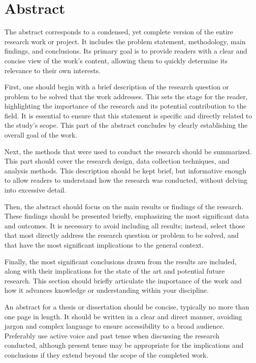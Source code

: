 \section*{Abstract}

The abstract corresponds to a condensed, yet complete version of the entire research work or project. It includes the problem statement, methodology, main findings, and conclusions. Its primary goal is to provide readers with a clear and concise view of the work's content, allowing them to quickly determine its relevance to their own interests.

First, one should begin with a brief description of the research question or problem to be solved that the work addresses. This sets the stage for the reader, highlighting the importance of the research and its potential contribution to the field. It is essential to ensure that this statement is specific and directly related to the study's scope. This part of the abstract concludes by clearly establishing the overall goal of the work.

Next, the methods that were used to conduct the research should be summarized. This part should cover the research design, data collection techniques, and analysis methods. This description should be kept brief, but informative enough to allow readers to understand how the research was conducted, without delving into excessive detail.

Then, the abstract should focus on the main results or findings of the research. These findings should be presented briefly, emphasizing the most significant data and outcomes. It is necessary to avoid including all results; instead, select those that most directly address the research question or problem to be solved, and that have the most significant implications to the general context.

Finally, the most significant conclusions drawn from the results are included, along with their implications for the state of the art and potential future research. This section should briefly articulate the importance of the work and how it advances knowledge or understanding within your discipline.

An abstract for a thesis or dissertation should be concise, typically no more than one page in length. It should be written in a clear and direct manner, avoiding jargon and complex language to ensure accessibility to a broad audience. Preferably use active voice and past tense when discussing the research conducted, although present tense may be appropriate for the implications and conclusions if they extend beyond the scope of the completed work.



